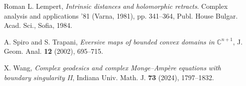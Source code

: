 \documentclass[12pt,a4paper]{amsart}
\numberwithin{equation}{section}
\theoremstyle{definition}
\begin{document}
\begin{thebibliography}{\;\;\; Roman}
  L. Lempert, {\it Intrinsic distances and holomorphic retracts}. Complex analysis and applications '81 (Varna, 1981), pp. 341--364, Publ. House Bulgar. Acad. Sci., Sofia, 1984.

 A. Spiro and S. Trapani, {\it Eversive maps of bounded convex domains in $\mathbb C^{n+1}$}, J. Geom. Anal. {\bf 12} (2002), 695--715.

 X. Wang, {\it Complex geodesics and complex Monge--Amp\`{e}re equations with boundary singularity II}, Indiana Univ. Math. J. {\bf 73} (2024), 1797--1832.

\end{thebibliography}
\end{document}
